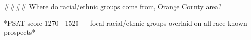 #### Where do racial/ethnic groups come from, Orange County area?

*PSAT score 1270 - 1520 — focal racial/ethnic groups overlaid on all race-known prospects*
